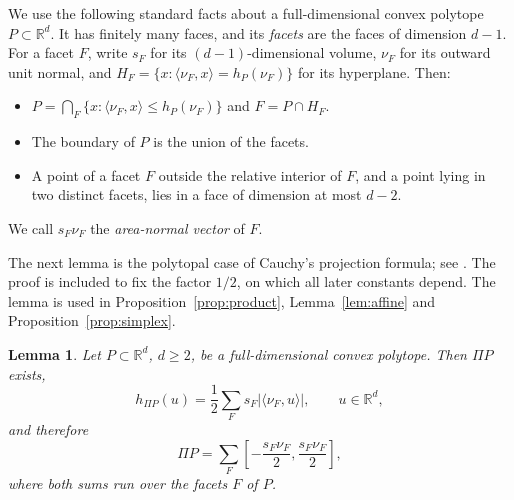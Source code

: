 \documentclass[11pt]{article}
\newtheorem{lemma}[theorem]{Lemma}
\newcommand{\R}{\mathbb R}
\begin{document}
We use the following standard facts about a full-dimensional convex
polytope \(P\subset\R^d\). It has finitely many faces, and its
\emph{facets} are the faces of dimension \(d-1\). For a facet \(F\), write
\(s_F\) for its \((d-1)\)-dimensional volume, \(\nu_F\) for its outward
unit normal, and \(H_F=\{x:\langle\nu_F,x\rangle=h_P(\nu_F)\}\) for its
hyperplane. Then:
\begin{itemize}[leftmargin=3em,itemsep=2pt]
\item[(P1)] \(P=\bigcap_F\{x:\langle\nu_F,x\rangle\le h_P(\nu_F)\}\) and
 \(F=P\cap H_F\).
\item[(P2)] The boundary of \(P\) is the union of the facets.
\item[(P3)] A point of a facet \(F\) outside the relative interior of
 \(F\), and a point lying in two distinct facets, lies in a face of
 dimension at most \(d-2\).
\end{itemize}
We call \(s_F\nu_F\) the \emph{area-normal vector} of \(F\).

The next lemma is the polytopal case of Cauchy's projection formula; see
\cite[Section~1]{Saroglou}. The proof is included to fix the factor
\(1/2\), on which all later constants depend. The lemma is used in
Proposition~\ref{prop:product}, Lemma~\ref{lem:affine} and
Proposition~\ref{prop:simplex}.

\begin{lemma}\label{lem:facets}
Let \(P\subset\R^d\), \(d\ge2\), be a full-dimensional convex polytope.
Then \(\Pi P\) exists,
\begin{equation}\label{eq:facet}
 h_{\Pi P}(u)=\frac12\sum_Fs_F|\langle\nu_F,u\rangle|,
 \qquad u\in\R^d,
\end{equation}
and therefore
\begin{equation}\label{eq:zonotope}
 \Pi P=\sum_F
 \left[-\frac{s_F\nu_F}{2},\frac{s_F\nu_F}{2}\right],
\end{equation}
where both sums run over the facets \(F\) of \(P\).
\end{lemma}
\end{document}
